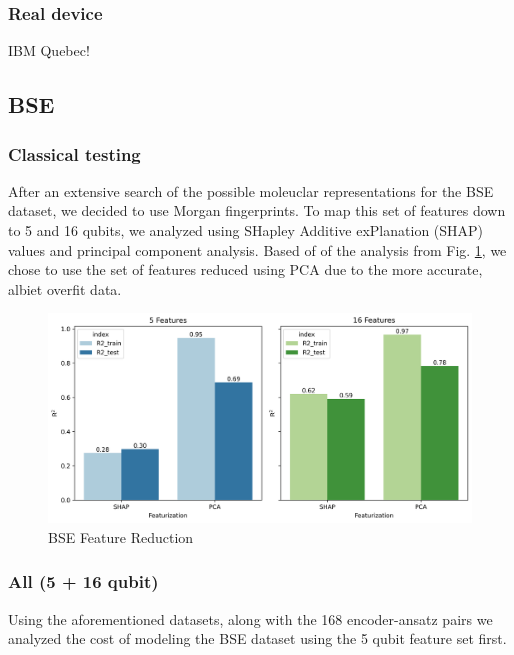 \documentclass[journal=jacsat,manuscript=article]{achemso}
\begin{document}
\subsubsection{Real device}
IBM Quebec!

\subsection{BSE} 

\subsubsection{Classical testing}
After an extensive search of the possible moleuclar representations for the BSE dataset, we decided to use Morgan fingerprints.
To map this set of features down to 5 and 16 qubits, we analyzed using SHapley Additive exPlanation (SHAP) values and principal component analysis.
Based of of the analysis from Fig. \ref{fig:Feat_redR2}, we chose to use the set of features reduced using PCA due to the more accurate, albiet overfit data.
\begin{figure}[H]
	\centering
	\includegraphics[width=\textwidth]{images/BSE/Feat_redR2.png}
	\caption{BSE Feature Reduction}
	\label{fig:Feat_redR2}
\end{figure}
\subsubsection{All (5 + 16 qubit)}
Using the aforementioned datasets, along with the 168 encoder-ansatz pairs we analyzed the cost of modeling the BSE dataset using the 5 qubit feature set first.
\end{document}
